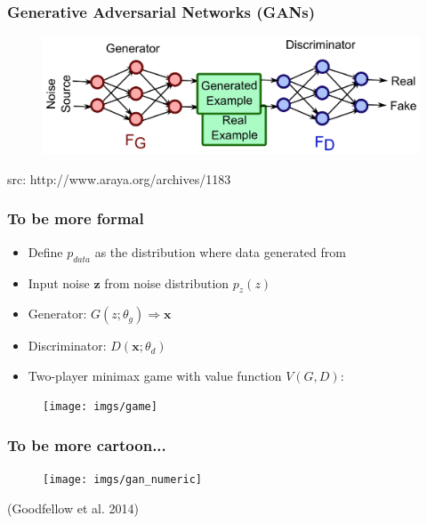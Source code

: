 \documentclass{beamer}
\begin{document}


\begin{frame}
\frametitle{Generative Adversarial Networks (GANs)}
\begin{figure}
\includegraphics[width=0.8\linewidth]{imgs/w1_gan.png}
\end{figure}
\vspace{1cm}
\hspace{7cm}\tiny{src: http://www.araya.org/archives/1183}
\end{frame}



\begin{frame}
\frametitle{To be more formal}
\begin{itemize}
\item Define $p_{data}$ as the distribution where data generated from
\item Input noise $\textbf{z}$ from noise distribution $p_z(z)$
\item Generator: $G(z;\theta_{g}) \Rightarrow \textbf{x}$
\item Discriminator: $D(\textbf{x}; \theta_{d})$
\item Two-player minimax game with value function $V(G, D)$:
\end{itemize}
\begin{figure}
\texttt{[image: imgs/game]}
\end{figure}
\end{frame}



\begin{frame}
\frametitle{To be more cartoon...}
\begin{figure}
\texttt{[image: imgs/gan\_numeric]}
\end{figure}
\vspace{1cm}
\hspace{9cm}\tiny{(Goodfellow et al. 2014)}
\end{frame}
\end{document}
